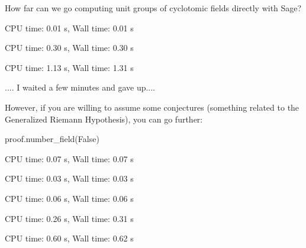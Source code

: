 How far can we go computing unit groups of cyclotomic fields
directly with Sage?
\begin{sagecode} %
\begin{sagecell}
\end{sagecell}
\begin{sageout}
CPU time: 0.01 s, Wall time: 0.01 s
\end{sageout}
\begin{sagecell}
\end{sagecell}
\begin{sageout}
CPU time: 0.30 s, Wall time: 0.30 s
\end{sageout}
\begin{sagecell}
\end{sagecell}
\begin{sageout}
CPU time: 1.13 s, Wall time: 1.31 s
\end{sageout}
\begin{sagecell}
\end{sagecell}
\begin{sageout}
.... I waited a few minutes and gave up....
\end{sageout}
\end{sagecode}

However, if you are willing to assume some conjectures (something
related to the Generalized Riemann Hypothesis), you can go further:
\begin{sagecode} %
\begin{sagecell}
proof.number_field(False)
\end{sagecell}
\begin{sageout}
CPU time: 0.07 s, Wall time: 0.07 s
\end{sageout}
\begin{sagecell}
\end{sagecell}
\begin{sageout}
CPU time: 0.03 s, Wall time: 0.03 s
\end{sageout}
\begin{sagecell}
\end{sagecell}
\begin{sageout}
CPU time: 0.06 s, Wall time: 0.06 s
\end{sageout}
\begin{sagecell}
\end{sagecell}
\begin{sageout}
CPU time: 0.26 s, Wall time: 0.31 s
\end{sageout}
\begin{sagecell}
\end{sagecell}
\begin{sageout}
CPU time: 0.60 s, Wall time: 0.62 s
\end{sageout}
\end{sagecode}

